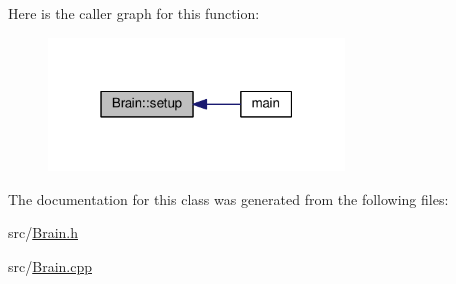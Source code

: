 Here is the caller graph for this function\+:
\nopagebreak
\begin{figure}[H]
\begin{center}
\leavevmode
\includegraphics[width=223pt]{class_brain_afa2f689c8360c9c9ad323bac5be4b42d_icgraph}
\end{center}
\end{figure}




The documentation for this class was generated from the following files\+:\begin{DoxyCompactItemize}
\item 
src/\hyperlink{_brain_8h}{Brain.\+h}\item 
src/\hyperlink{_brain_8cpp}{Brain.\+cpp}\end{DoxyCompactItemize}
